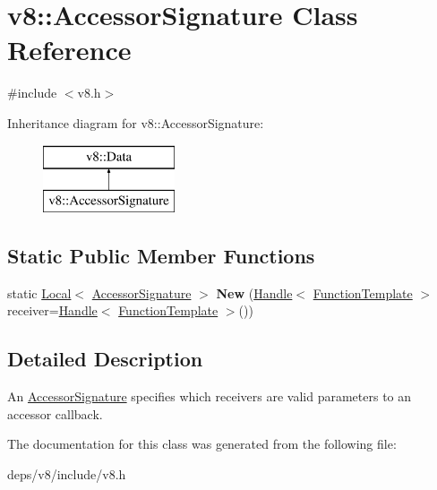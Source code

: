 \hypertarget{classv8_1_1_accessor_signature}{}\section{v8\+:\+:Accessor\+Signature Class Reference}
\label{classv8_1_1_accessor_signature}


{\ttfamily \#include $<$v8.\+h$>$}

Inheritance diagram for v8\+:\+:Accessor\+Signature\+:\begin{figure}[H]
\begin{center}
\leavevmode
\includegraphics[height=2.000000cm]{classv8_1_1_accessor_signature}
\end{center}
\end{figure}
\subsection*{Static Public Member Functions}
\begin{DoxyCompactItemize}
\item 
\hypertarget{classv8_1_1_accessor_signature_a0e257ea940a2693c301940a279d5db36}{}static \hyperlink{classv8_1_1_local}{Local}$<$ \hyperlink{classv8_1_1_accessor_signature}{Accessor\+Signature} $>$ {\bfseries New} (\hyperlink{classv8_1_1_handle}{Handle}$<$ \hyperlink{classv8_1_1_function_template}{Function\+Template} $>$ receiver=\hyperlink{classv8_1_1_handle}{Handle}$<$ \hyperlink{classv8_1_1_function_template}{Function\+Template} $>$())\label{classv8_1_1_accessor_signature_a0e257ea940a2693c301940a279d5db36}

\end{DoxyCompactItemize}


\subsection{Detailed Description}
An \hyperlink{classv8_1_1_accessor_signature}{Accessor\+Signature} specifies which receivers are valid parameters to an accessor callback. 

The documentation for this class was generated from the following file\+:\begin{DoxyCompactItemize}
\item 
deps/v8/include/v8.\+h\end{DoxyCompactItemize}

